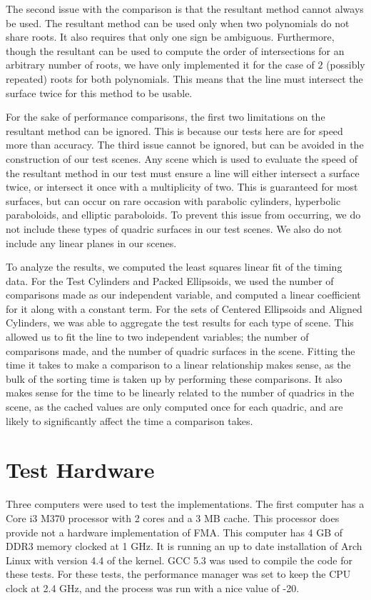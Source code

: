 \documentclass{cccg16}
\begin{document}
The second issue with the comparison is that the resultant method
cannot always be used.  The resultant method can be used only when two
polynomials do not share roots.  It also requires that only one sign
be ambiguous.  Furthermore, though the resultant can be used to
compute the order of intersections for an arbitrary number of roots,
we have only implemented it for the case of $2$ (possibly repeated)
roots for both polynomials.  This means that the line must intersect
the surface twice for this method to be usable.

For the sake of performance comparisons, the first two limitations on
the resultant method can be ignored.  This is because our tests here
are for speed more than accuracy.  The third issue cannot be ignored,
but can be avoided in the construction of our test scenes.  Any scene
which is used to evaluate the speed of the resultant method in our
test must ensure a line will either intersect a surface twice, or
intersect it once with a multiplicity of two.  This is guaranteed for
most surfaces, but can occur on rare occasion with parabolic
cylinders, hyperbolic paraboloids, and elliptic paraboloids.  To
prevent this issue from occurring, we do not include these types of
quadric surfaces in our test scenes.  We also do not include any
linear planes in our scenes.

To analyze the results, we computed the least squares linear fit of
the timing data.  For the Test Cylinders and Packed Ellipsoids, we
used the number of comparisons made as our independent variable, and
computed a linear coefficient for it along with a constant term.  For
the sets of Centered Ellipsoids and Aligned Cylinders, we was able to
aggregate the test results for each type of scene.  This allowed us to
fit the line to two independent variables; the number of comparisons
made, and the number of quadric surfaces in the scene.  Fitting the
time it takes to make a comparison to a linear relationship makes
sense, as the bulk of the sorting time is taken up by performing these
comparisons.  It also makes sense for the time to be linearly related
to the number of quadrics in the scene, as the cached values are only
computed once for each quadric, and are likely to significantly affect
the time a comparison takes.

\section{Test Hardware}
Three computers were used to test the implementations.  The first
computer has a Core i3 M370 processor with 2 cores and a 3 MB cache.
This processor does provide not a hardware implementation of FMA.
This computer has 4 GB of DDR3 memory clocked at 1 GHz.  It is running
an up to date installation of Arch Linux with version 4.4 of the
kernel.  GCC 5.3 was used to compile the code for these tests.  For
these tests, the performance manager was set to keep the CPU clock at
2.4 GHz, and the process was run with a nice value of -20.
\end{document}
